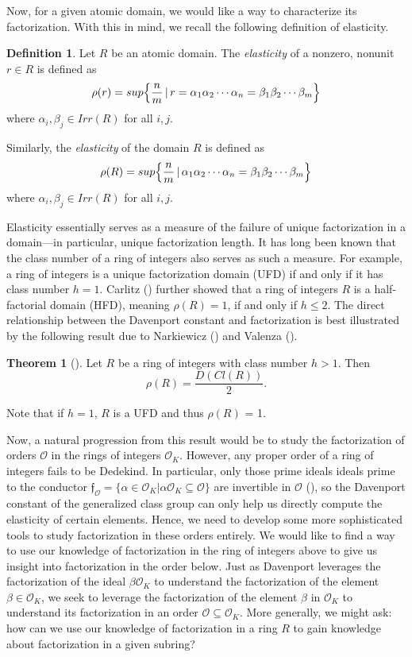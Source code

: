 \documentclass{amsart}
\theoremstyle{definition}
\newtheorem{thm}[lem]{Theorem}
\newtheorem{defn}[lem]{Definition}
\newcommand{\MO}{\mathcal{O}}
\renewcommand{\leq}{\leqslant}
\numberwithin{equation}{section}
\begin{document}
Now, for a given atomic domain, we would like a way to characterize its factorization. With this in mind, we recall the following definition of elasticity. 

\begin{defn}
    Let $R$ be an atomic domain. The \textit{elasticity} of a nonzero, nonunit $r \in R$ is defined as 
    \[ 
    \rho(r) = sup\Bigl\{\frac{n}{m} \,|\, r = \alpha_1 \alpha_2 \dotsm \alpha_n = \beta_1 \beta_2 \dotsm \beta_m\Bigr\} 
    \]
     where $\alpha_i, \beta_j \in Irr(R)$ for all $i,j$.


    Similarly, the \textit{elasticity} of the domain $R$ is defined as 
    \[ 
    \rho(R) = sup\Bigl\{\frac{n}{m} \,|\, \alpha_1 \alpha_2 \dotsm \alpha_n = \beta_1 \beta_2 \dotsm \beta_m\Bigr\}
    \]
     where $\alpha_i, \beta_j \in Irr(R)$ for all $i,j$. 
\end{defn}


 Elasticity essentially serves as a measure of the failure of unique factorization in a domain---in particular, unique factorization length. It has long been known that the class number of a ring of integers also serves as such a measure. For example, a ring of integers is a unique factorization domain (UFD) if and only if it has class number $h = 1$. Carlitz (\cite{Carlitz1960}) further showed that a ring of integers $R$ is a half-factorial domain (HFD), meaning $\rho(R) = 1$, if and only if $ h \leq 2$. The direct relationship between the Davenport constant and factorization is best illustrated by the following result due to Narkiewicz (\cite{Narkiewicz1995Note}) and Valenza (\cite{valenza1990elasticity}). 
\begin{thm}[\cite{Narkiewicz1995Note}]
    Let $R$ be a ring of integers with class number $h > 1$. Then
    \[
    \rho(R) = \frac{D(Cl(R))}{2}.
    \]
\end{thm}

Note that if $h =1$, $R$ is a UFD and thus $\rho(R)$ = 1.

Now, a natural progression from this result would be to study the factorization of orders $\MO$ in the rings of integers $\MO_K$. However, any proper order of a ring of integers fails to be Dedekind. In particular, only those prime ideals ideals prime to the conductor $\mathfrak{f}_\MO = \{\alpha \in \MO_K | \alpha \MO_K \subseteq \MO\}$ are invertible in $\MO$ (\cite{cox2022primes}), so the Davenport constant of the generalized class group can only help us directly compute the elasticity of certain elements. Hence, we need to develop some more sophisticated tools to study factorization in these orders entirely. We would like to find a way to use our knowledge of factorization in the ring of integers above to give us insight into factorization in the order below. Just as Davenport leverages the factorization of the ideal $\beta \MO_K$ to understand the factorization of the element $\beta \in \MO_K$, we seek to leverage the factorization of the element $\beta$ in $\MO_K$ to understand its factorization in an order $\MO \subseteq \MO_K$. More generally, we might ask: how can we use our knowledge of factorization in a ring $R$ to gain knowledge about factorization in a given subring?
\end{document}
